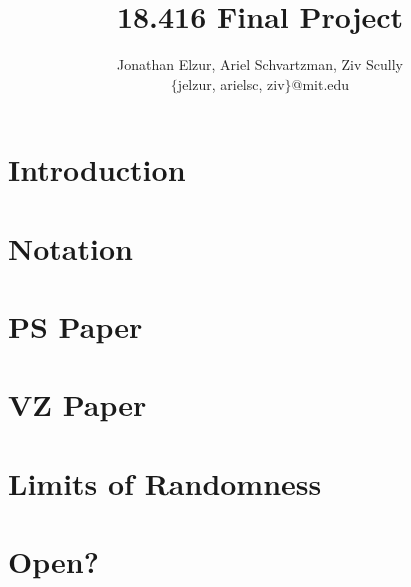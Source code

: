 \documentclass[10pt,letter]{article}
\begin{document}


\title{18.416 Final Project}

\author{Jonathan Elzur, Ariel Schvartzman, Ziv Scully \\ $\{$jelzur, arielsc, ziv$\}$@mit.edu} 
 
\maketitle 

\section{Introduction} 
\section{Notation}
\section{PS Paper}
\section{VZ Paper}
\section{Limits of Randomness}
\section{Open?}
 
\end{document}
